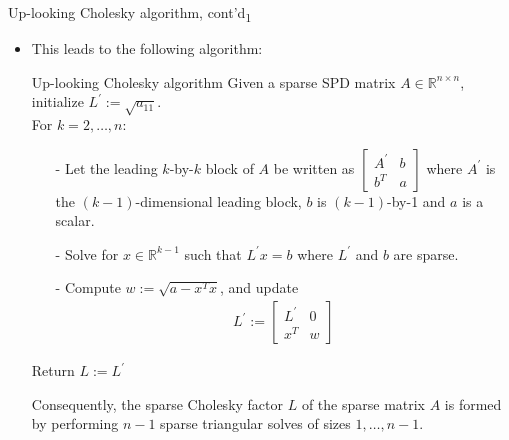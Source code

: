 \documentclass[t,usepdftitle=false]{beamer}
\begin{document}
\begin{frame}{Up-looking Cholesky algorithm, cont'd\textsubscript{1}}
\begin{itemize}
\item This leads to the following algorithm:
\begin{block}{Up-looking Cholesky algorithm}
Given a sparse SPD matrix $A\in\mathbb{R}^{n\times n}$, initialize $L^\prime:=\sqrt{a_{11}}$.\vspace{.1cm}\\
For $k=2,\dots,n$:\vspace{-.1cm}
\begin{itemize}
\item[-] Let the leading $k$-by-$k$ block of $A$ be written as $\begin{bmatrix}A^\prime & b\\b^T&a\end{bmatrix}$ where $A^\prime$ is the $(k-1)$-dimensional leading block, $b$ is $(k-1)$-by-1 and $a$ is a scalar.
\item[-] Solve for $x\in\mathbb{R}^{k-1}$ such that $L^\prime x=b$ where $L^\prime$ and $b$ are sparse.
\item[-] Compute $w:=\sqrt{a-x^Tx}$, and update
\begin{align*}
L^\prime:=
\begin{bmatrix}
L^\prime&0\\
x^T&w
\end{bmatrix}
\end{align*}
\end{itemize}
Return $L:=L^\prime$
\end{block}
Consequently, the sparse Cholesky factor $L$ of the sparse matrix $A$ is formed by performing $n-1$ sparse triangular solves of sizes $1,\dots,n-1$.
\end{itemize}
\end{frame}
\end{document}
